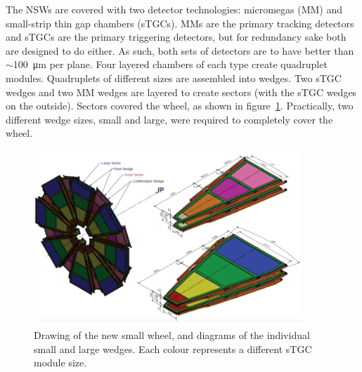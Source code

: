The NSWs are covered with two detector technologies: micromegas (MM) and small-strip thin gap chambers (sTGCs). MMs are the primary tracking detectors and sTGCs are the primary triggering detectors, but for redundancy sake both are designed to do either. As such, both sets of detectors are to have better than $\sim$\SI{100}{\micro\meter} per plane. Four layered chambers of each type create quadruplet modules. Quadruplets of different sizes are assembled into wedges. Two sTGC wedges and two MM wedges are layered to create sectors (with the sTGC wedges on the outside). Sectors covered the wheel, as shown in figure~\ref{fig:nsw_diagram}. Practically, two different wedge sizes, small and large, were required to completely cover the wheel.
\begin{figure}
    \centering
    \includegraphics[width = 0.9\textwidth]{figures/nsw_diagram.png}
    \caption{Drawing of the new small wheel, and diagrams of the individual small and large wedges. Each colour represents a different sTGC module size.}
    \label{fig:nsw_diagram}
\end{figure}

